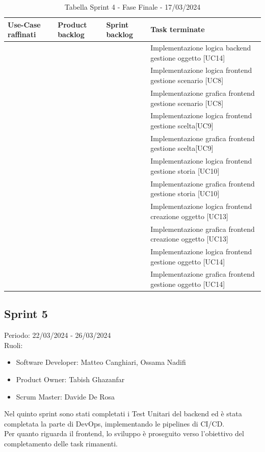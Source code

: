 \documentclass{article}
\begin{document}
\begin{table}[h]
    \centering
    \begin{tabularx}{\textwidth}{|X|X|X|X|}
        \hline
        \bf Use-Case raffinati & \bf Product backlog & \bf Sprint backlog & \bf Task terminate \\
        \hline
        & & & Implementazione logica backend gestione oggetto [UC14] \\
        \hline
        & & & Implementazione logica frontend gestione scenario [UC8] \\
        \hline
        & & & Implementazione grafica frontend gestione scenario [UC8] \\
        \hline
        & & & Implementazione logica frontend gestione scelta[UC9] \\
        \hline
        & & & Implementazione grafica frontend gestione scelta[UC9] \\
        \hline
        & & & Implementazione logica frontend gestione storia [UC10] \\
        \hline
        & & & Implementazione grafica frontend gestione storia [UC10] \\
        \hline
        & & & Implementazione logica frontend creazione oggetto [UC13] \\
        \hline
        & & & Implementazione grafica frontend creazione oggetto [UC13] \\
        \hline
        & & & Implementazione logica frontend gestione oggetto [UC14] \\
        \hline
        & & & Implementazione grafica frontend gestione oggetto [UC14] \\
        \hline
    \end{tabularx}
    \caption*{Tabella Sprint 4 - Fase Finale - 17/03/2024}
\end{table}

\clearpage
\subsection*{Sprint 5}
Periodo: 22/03/2024 - 26/03/2024\vspace*{7pt}\\
Ruoli:
\begin{itemize}[label = { }]
    \itemsep0em
    \item Software Developer: Matteo Canghiari, Ossama Nadifi 
    \item Product Owner: Tabish Ghazanfar
    \item Scrum Master: Davide De Rosa
\end{itemize}
Nel quinto sprint sono stati completati i Test Unitari del backend ed è stata completata la parte di DevOps, implementando le pipelines di CI/CD.\\
Per quanto riguarda il frontend, lo sviluppo è proseguito verso l'obiettivo del completamento delle task rimanenti.
\end{document}
